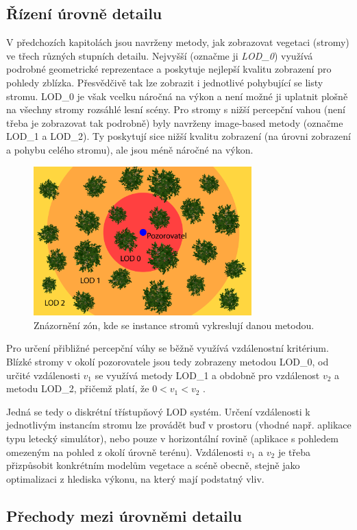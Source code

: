 \subsection{Řízení úrovně detailu}
\label{sec-LODcontrol}
V předchozích kapitolách jsou navrženy metody, jak zobrazovat vegetaci (stromy) ve třech různých stupních detailu. Nejvyšší (označme ji \emph{LOD\_0}) využívá podrobné geometrické reprezentace a poskytuje nejlepší kvalitu zobrazení pro pohledy zblízka. Přesvědčivě tak lze zobrazit i jednotlivé pohybující se listy stromu. LOD\_0 je však vcelku náročná na výkon a není možné ji uplatnit plošně na všechny stromy rozsáhlé lesní scény. Pro stromy s nižší percepční vahou (není třeba je zobrazovat tak podrobně) byly navrženy image-based metody (označme LOD\_1 a LOD\_2). Ty poskytují sice nižší kvalitu zobrazení (na úrovni zobrazení a pohybu celého stromu), ale jsou méně náročné na výkon. 
\begin{figure}[!hbt]
\begin{center}
\includegraphics[width=0.75\textwidth]{./figures/LODcontrol.png}
\caption{Znázornění zón, kde se instance stromů vykreslují danou metodou.\label{fig:lodZones}}
\end{center}
\end{figure}

Pro určení přibližné percepční váhy se běžně využívá vzdálenostní kritérium. Blízké stromy v okolí pozorovatele jsou tedy zobrazeny metodou LOD\_0, od určité vzdálenosti $v_1$ se využívá metody LOD\_1 a obdobně pro vzdálenost $v_2$ a metodu LOD\_2, přičemž platí, že $0<v_1<v_2$ .

Jedná se tedy o diskrétní třístupňový LOD systém. Určení vzdálenosti k jednotlivým instancím stromu lze provádět buď v prostoru (vhodné např. aplikace typu letecký simulátor), nebo pouze v horizontální rovině (aplikace s pohledem omezeným na pohled z okolí úrovně terénu). Vzdálenosti $v_1$ a $v_2$ je třeba přizpůsobit konkrétním modelům vegetace a scéně obecně, stejně jako optimalizaci z hlediska výkonu, na který mají podstatný vliv.


\subsection{Přechody mezi úrovněmi detailu}
\label{sec-LODtransitions}